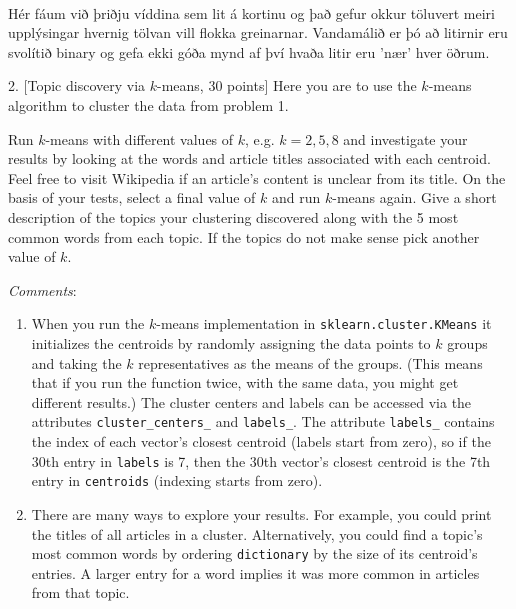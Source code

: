 \documentclass[11pt]{article}
\begin{document}
    \begin{center}
    \end{center}
    { \hspace*{\fill} \\}
    
    Hér fáum við þriðju víddina sem lit á kortinu og það gefur okkur
töluvert meiri upplýsingar hvernig tölvan vill flokka greinarnar.
Vandamálið er þó að litirnir eru svolítið binary og gefa ekki góða mynd
af því hvaða litir eru 'nær' hver öðrum.

    2. {[}Topic discovery via \(k\)-means, 30 points{]} Here you are to use
the \(k\)-means algorithm to cluster the data from problem 1.

Run \(k\)-means with different values of \(k\), e.g. \(k=2,5,8\) and
investigate your results by looking at the words and article titles
associated with each centroid. Feel free to visit Wikipedia if an
article's content is unclear from its title. On the basis of your tests,
select a final value of \(k\) and run \(k\)-means again. Give a short
description of the topics your clustering discovered along with the 5
most common words from each topic. If the topics do not make sense pick
another value of \(k\).

\emph{Comments}:

\begin{enumerate}
\def\labelenumi{\arabic{enumi})}
\item
  When you run the \(k\)-means implementation in
  \texttt{sklearn.cluster.KMeans} it initializes the centroids by
  randomly assigning the data points to \(k\) groups and taking the
  \(k\) representatives as the means of the groups. (This means that if
  you run the function twice, with the same data, you might get diﬀerent
  results.) The cluster centers and labels can be accessed via the
  attributes \texttt{cluster\_centers\_} and \texttt{labels\_}. The
  attribute \texttt{labels\_} contains the index of each vector's
  closest centroid (labels start from zero), so if the 30th entry in
  \texttt{labels} is 7, then the 30th vector's closest centroid is the
  7th entry in \texttt{centroids} (indexing starts from zero).
\item
  There are many ways to explore your results. For example, you could
  print the titles of all articles in a cluster. Alternatively, you
  could ﬁnd a topic's most common words by ordering \texttt{dictionary}
  by the size of its centroid's entries. A larger entry for a word
  implies it was more common in articles from that topic.
\end{enumerate}
\end{document}
